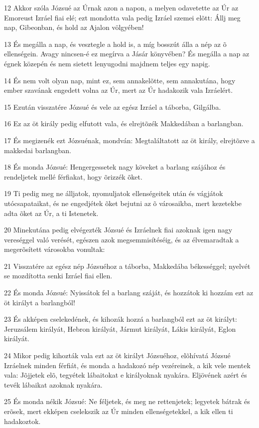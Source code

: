 \par 12 Akkor szóla Józsué az Úrnak azon a napon, a melyen odavetette az Úr az Emoreust Izráel fiai elé; ezt mondotta vala pedig Izráel szemei elõtt: Állj meg nap, Gibeonban, és hold az Ajalon völgyében!
\par 13 És megálla a nap, és vesztegle a hold is, a míg bosszút álla a nép az õ ellenségein. Avagy nincsen-é ez megírva a Jásár könyvében? És megálla a nap az égnek közepén és nem sietett lenyugodni majdnem teljes egy napig.
\par 14 És nem volt olyan nap, mint ez, sem annakelõtte, sem annakutána, hogy ember szavának engedett volna az Úr, mert az Úr hadakozik vala Izráelért.
\par 15 Ezután visszatére Józsué és vele az egész Izráel a táborba, Gilgálba.
\par 16 Ez az öt király pedig elfutott vala, és elrejtõzék Makkedában a barlangban.
\par 17 És megizenék ezt Józsuénak, mondván: Megtaláltatott az öt király, elrejtõzve a makkedai barlangban.
\par 18 És monda Józsué: Hengergessetek nagy köveket a barlang szájához és rendeljetek mellé férfiakat, hogy õrizzék õket.
\par 19 Ti pedig meg ne álljatok, nyomuljatok ellenségeitek után és vágjátok utócsapataikat, és ne engedjétek õket bejutni az õ városaikba, mert kezetekbe adta õket az Úr, a ti Istenetek.
\par 20 Minekutána pedig elvégezték Józsué és Izráelnek fiai azoknak igen nagy vereséggel való verését, egészen azok megsemmisítéséig, és az élvemaradtak a megerõsített városokba vonultak:
\par 21 Visszatére az egész nép Józsuéhoz a táborba, Makkedába békességgel; nyelvét se mozdította senki Izráel fiai ellen.
\par 22 És monda Józsué: Nyissátok fel a barlang száját, és hozzátok ki hozzám ezt az öt királyt a barlangból!
\par 23 És akképen cselekedének, és kihozák hozzá a barlangból ezt az öt királyt: Jeruzsálem királyát, Hebron királyát, Jármut királyát, Lákis királyát, Eglon királyát.
\par 24 Mikor pedig kihozták vala ezt az öt királyt Józsuéhoz, elõhívatá Józsué Izráelnek minden férfiát, és monda a hadakozó nép vezéreinek, a kik vele mentek vala: Jõjjetek elõ, tegyétek lábaitokat e királyoknak nyakára. Eljövének azért és tevék lábaikat azoknak nyakára.
\par 25 És monda nékik Józsué: Ne féljetek, és meg ne rettenjetek; legyetek bátrak és erõsek, mert ekképen cselekszik az Úr minden ellenségetekkel, a kik ellen ti hadakoztok.
